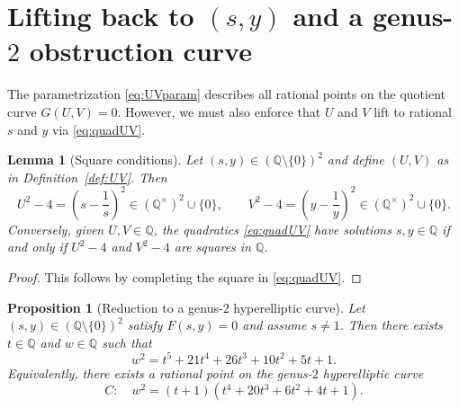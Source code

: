 \documentclass[12pt]{article}
\newtheorem{lemma}{Lemma}
\newtheorem{proposition}{Proposition}
\theoremstyle{remark}
\theoremstyle{definition}
\begin{document}

\section{Lifting back to \texorpdfstring{$(s,y)$}{(s,y)} and a genus-\texorpdfstring{$2$}{2} obstruction curve}\label{sec:hyper}

The parametrization \eqref{eq:UVparam} describes all rational points on the quotient curve $G(U,V)=0$.
However, we must also enforce that $U$ and $V$ lift to rational $s$ and $y$ via \eqref{eq:quadUV}.

\begin{lemma}[Square conditions]\label{lem:squares}
Let $(s,y)\in(\mathbb{Q}\setminus\{0\})^2$ and define $(U,V)$ as in Definition~\ref{def:UV}.
Then
\[
U^{2}-4=\left(s-\frac1s\right)^{2}\in(\mathbb{Q}^{\times})^{2}\cup\{0\},\qquad
V^{2}-4=\left(y-\frac1y\right)^{2}\in(\mathbb{Q}^{\times})^{2}\cup\{0\}.
\]
Conversely, given $U,V\in\mathbb{Q}$, the quadratics \eqref{eq:quadUV} have solutions $s,y\in\mathbb{Q}$ if and only if $U^{2}-4$ and $V^{2}-4$ are squares in $\mathbb{Q}$.
\end{lemma}

\begin{proof}
This follows by completing the square in \eqref{eq:quadUV}.
\end{proof}

\begin{proposition}[Reduction to a genus-$2$ hyperelliptic curve]\label{prop:hyper}
Let $(s,y)\in(\mathbb{Q}\setminus\{0\})^{2}$ satisfy $F(s,y)=0$ and assume $s\neq 1$.
Then there exists $t\in\mathbb{Q}$ and $w\in\mathbb{Q}$ such that
\begin{equation}\label{eq:C}
w^{2}=t^{5}+21t^{4}+26t^{3}+10t^{2}+5t+1.
\end{equation}
Equivalently, there exists a rational point on the genus-$2$ hyperelliptic curve
\begin{equation}\label{eq:Ccurve}
C:\quad w^{2}=(t+1)(t^{4}+20t^{3}+6t^{2}+4t+1).
\end{equation}
\end{proposition}
\end{document}
